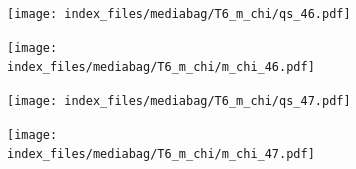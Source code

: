 \documentclass[
  11pt,
  letterpaper,
]{scrreprt}
\begin{document}
\begin{figure}

\begin{minipage}{0.50\linewidth}

\begin{figure}[H]

{\centering \texttt{[image: index\_files/mediabag/T6\_m\_chi/qs\_46.pdf]}

}


\end{figure}%

\end{minipage}%
%
\begin{minipage}{0.50\linewidth}

\begin{figure}[H]

{\centering \texttt{[image: index\_files/mediabag/T6\_m\_chi/m\_chi\_46.pdf]}

}


\end{figure}%

\end{minipage}%

\end{figure}%

\begin{figure}

\begin{minipage}{0.50\linewidth}

\begin{figure}[H]

{\centering \texttt{[image: index\_files/mediabag/T6\_m\_chi/qs\_47.pdf]}

}


\end{figure}%

\end{minipage}%
%
\begin{minipage}{0.50\linewidth}

\begin{figure}[H]

{\centering \texttt{[image: index\_files/mediabag/T6\_m\_chi/m\_chi\_47.pdf]}

}


\end{figure}%

\end{minipage}%

\end{figure}%
\end{document}
